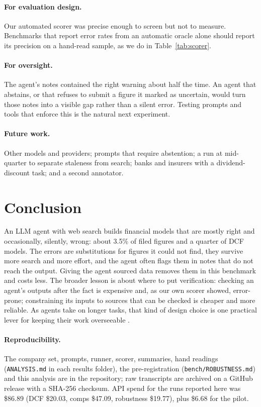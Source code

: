 \documentclass[10pt,a4paper]{article}
\begin{document}
\paragraph{For evaluation design.} Our automated scorer was precise enough to screen but not to measure. Benchmarks
that report error rates from an automatic oracle alone should report its precision on a hand-read sample, as we do
in Table~\ref{tab:scorer}.

\paragraph{For oversight.} The agent's notes contained the right warning about half the time. An agent that abstains,
or that refuses to submit a figure it marked as uncertain, would turn those notes into a visible gap rather than a
silent error. Testing prompts and tools that enforce this is the natural next experiment.

\paragraph{Future work.} Other models and providers; prompts that require abstention; a run at mid-quarter to
separate staleness from search; banks and insurers with a dividend-discount task; and a second annotator.

\section{Conclusion}

An LLM agent with web search builds financial models that are mostly right and occasionally, silently, wrong: about
3.5\% of filed figures and a quarter of DCF models. The errors are substitutions for figures it could not find, they
survive more search and more effort, and the agent often flags them in notes that do not reach the output. Giving the
agent sourced data removes them in this benchmark and costs less. The broader lesson is about where to put
verification: checking an agent's outputs after the fact is expensive and, as our own scorer showed, error-prone;
constraining its inputs to sources that can be checked is cheaper and more reliable. As agents take on longer tasks,
that kind of design choice is one practical lever for keeping their work overseeable \citep{bowman2022}.

\paragraph{Reproducibility.} The company set, prompts, runner, scorer, summaries, hand readings
(\texttt{ANALYSIS.md} in each results folder), the pre-registration (\texttt{bench/ROBUSTNESS.md}) and this analysis
are in the repository; raw transcripts are archived on a GitHub release with a SHA-256 checksum. API spend for the runs
reported here was \$86.89 (DCF \$20.03, comps \$47.09, robustness \$19.77), plus \$6.68 for the pilot.
\end{document}
